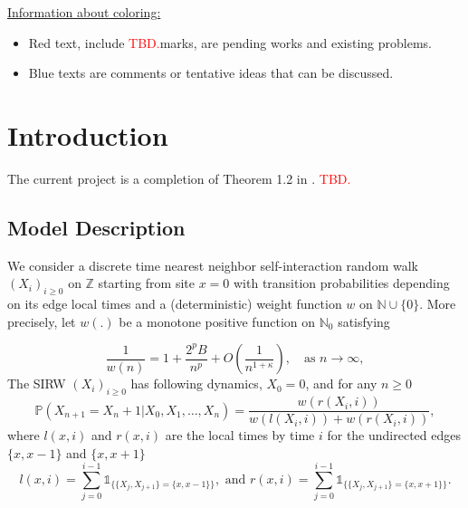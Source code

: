 \documentclass[twoside,12pt,a4paper]{article}
\numberwithin{equation}{section}
\newcommand\TBD{\textcolor{red}{TBD.}}
\begin{document}
	\maketitle

	\setcounter{page}{1} 
	
	\begin{abstract}
		This document is an outline of the article for the Scaling limit of SIRW. We complete the functional CLT in \cite{KMP22} for the asymptotically free self-interacting random walk (AF-SIRW) in the case $0<p \leq \frac{1}{2}$. The approach is to carefully approximate the local drifts of the random walk via the study of the directed edge local times, which are described by branching-like processes and generalized Ray-knight Theorems. Xiaoyu Liu and Zhe Wang are working on this project. 
		\TBD
	\end{abstract}
	
	\underline{\textsf{Information about coloring:}}
	\begin{itemize}
		\item 
	\textsf{\color{red} Red text, include \TBD marks, are pending works and existing problems.}
		\item 
			\textsf{\color{blue} Blue texts are comments or tentative ideas that can be discussed.}
	\end{itemize}



	\section{Introduction}
	The current project is a completion of Theorem 1.2 in \cite{KMP22}. 
	\TBD 
	
	\subsection{Model Description} 
	We consider a discrete time nearest neighbor self-interaction random walk $(X_i)_{i\geq 0}$ on $\mathbb{Z}$ starting from site $x=0$ with transition probabilities depending on its edge local times and a (deterministic) weight function $w$ on $\mathbb{N}\cup \{0\}$. More precisely, let $w(.)$ be a monotone positive function on $\mathbb{N}_0$ satisfying
	
	
	\begin{equation}\label{eq: asymptotics of w}
		\frac{1}{w(n)} = 1+\frac{2^p B}{n^p} + O\left(\frac{1}{n^{1+\mathcal{\kappa}}}\right), \quad \mbox{as $n\to \infty$}, 	
	\end{equation} 
	The SIRW $(X_i)_{i\geq 0}$ has following dynamics, 
	$X_0 = 0$, and for any $n\geq 0$
	\begin{equation}\label{dynamic}
		\mathbb{P}\left( X_{n+1} =  X_n +1 | X_0,X_1,\dots,X_n   \right) =  \frac{  w(r(X_i,i) )}{ w(l(X_i,i))  + w(r(X_i,i))   },
	\end{equation}
	where $l(x,i)$ and $r(x,i)$ are the local times by time $i$ for the undirected edges $\{x,x-1\}$ and $\{x,x+1\}$
	$$ l(x,i) = \sum_{j=0}^{i-1} \mathbb{1}_{ \{  \{X_j, X_{j+1}\} =  \{x,x-1\} \} }, \mbox{ and }  r(x,i) = \sum_{j=0}^{i-1} \mathbb{1}_{ \{  \{X_j, X_{j+1}\} =  \{x,x+1\} \} }.        $$
	
\end{document}
